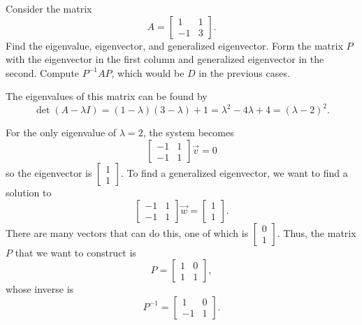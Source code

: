 \begin{example}
Consider the matrix 
\[ A = \begin{bmatrix} 1 & 1 \\ -1 & 3 \end{bmatrix}. \] Find the eigenvalue, eigenvector, and generalized eigenvector. Form the matrix $P$ with the eigenvector in the first column and generalized eigenvector in the second. Compute $P^{-1}AP$, which would be $D$ in the previous cases.
\end{example}

\begin{exampleSol}
The eigenvalues of this matrix can be found by
\[ \det(A - \lambda I) = (1-\lambda)(3-\lambda) + 1 = \lambda^2 - 4\lambda + 4 = (\lambda - 2)^2. \]

For the only eigenvalue of $\lambda = 2$, the system becomes
\[ \begin{bmatrix} -1 & 1 \\ -1 & 1 \end{bmatrix} \vec{v} = 0\] so the eigenvector is $\begin{bmatrix} 1 \\ 1 \end{bmatrix}$. To find a generalized eigenvector, we want to find a solution to
\[ \begin{bmatrix} -1 & 1 \\ -1 & 1 \end{bmatrix} \vec{w} = \begin{bmatrix} 1 \\ 1 \end{bmatrix}.\] There are many vectors that can do this, one of which is $\begin{bmatrix} 0 \\ 1 \end{bmatrix}$. Thus, the matrix $P$ that we want to construct is 
\[ P = \begin{bmatrix} 1 & 0 \\ 1 & 1 \end{bmatrix},\] whose inverse is
\[ P^{-1} = \begin{bmatrix} 1 & 0 \\ -1 & 1 \end{bmatrix}.\]


\end{exampleSol}
